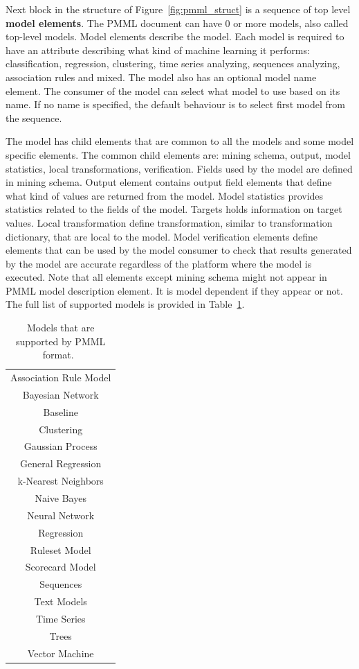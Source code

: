 \documentclass[english, 12pt, a4paper, elec, utf8, online]{aaltothesis}
\begin{document}
Next block in the structure of Figure~\ref{fig:pmml_struct} is a sequence of top level \textbf{model elements}. The PMML document can have 0 or more models, also called top-level models.  Model elements describe the model. Each model is required to have an attribute describing what kind of machine learning it performs: classification, regression, clustering, time series analyzing, sequences analyzing, association rules and mixed. The model also has an optional model name element. The consumer of the model can select what model to use based on its name. If no name is specified, the default behaviour is to select first model from the sequence.

The model has child elements that are common to all the models and some model specific elements. The common child elements are: mining schema, output, model statistics, local transformations, verification. Fields used by the model are defined in mining schema. Output element contains output field elements that define what kind of values are returned from the model. Model statistics provides statistics related to the fields of the model. Targets holds information on target values. Local transformation define transformation, similar to transformation dictionary, that are local to the model. Model verification elements define elements that can be used by the model consumer to check that results generated by the model are accurate regardless of the platform where the model is executed. Note that all elements except mining schema might not appear in PMML model description element. It is model dependent if they appear or not. The full list of supported models is provided in Table~\ref{tab:pmml_sup_models}. 

\begin{table}[h]
\begin{center}
\caption{Models that are supported by PMML format.~\cite{pmml_spec}}\label{tab:pmml_sup_models}
\begin{tabular}{c}
Association Rule Model \\
Bayesian Network \\
Baseline \\
Clustering \\
Gaussian Process \\
General Regression \\
k-Nearest Neighbors \\
Naive Bayes \\
Neural Network \\
Regression \\
Ruleset Model\\
Scorecard Model\\
Sequences \\
Text Models \\
Time Series \\
Trees \\
Vector Machine
\end{tabular}
\end{center}
\end{table}
\end{document}
